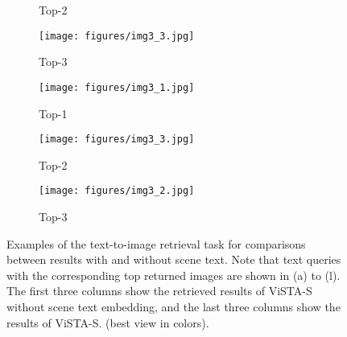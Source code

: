 \documentclass[10pt,twocolumn,letterpaper]{article}
\begin{document}
\begin{figure*}[ht]
\begin{subfigure}{.1585\textwidth}
    \caption{Top-2 \textcolor{red}{\CheckmarkBold}}
    \label{sf2}
  \end{subfigure}
  \begin{subfigure}{.1585\textwidth}
    \centering
    \texttt{[image: figures/img3\_3.jpg]}
    \caption{Top-3 \textcolor{blue}{\XSolidBrush}}
    \label{sf2}
  \end{subfigure}
  \hspace{2mm}
  \begin{subfigure}{.1585\textwidth}
    \centering
    \texttt{[image: figures/img3\_1.jpg]}
    \caption{Top-1 \textcolor{red}{\CheckmarkBold}}
    \label{sf1}
  \end{subfigure}
  \begin{subfigure}{.1585\textwidth}
    \centering
    \texttt{[image: figures/img3\_3.jpg]}
    \caption{Top-2 \textcolor{blue}{\XSolidBrush}}
    \label{sf2}
  \end{subfigure}
  \begin{subfigure}{.1585\textwidth}
    \centering
    \texttt{[image: figures/img3\_2.jpg]}
    \caption{Top-3 \textcolor{blue}{\XSolidBrush}}
    \label{sf2}
  \end{subfigure}
  \vspace{-0.5em}
  \caption{Examples of the text-to-image retrieval task for comparisons between results with and without scene text. Note that text queries with the corresponding top returned images are shown in (a) to (l). The first three columns show the retrieved results of ViSTA-S without scene text embedding, and the last three columns show the results of ViSTA-S. (best view in colors).}
  \label{fig:text2image-demo}
\end{figure*}
\end{document}
